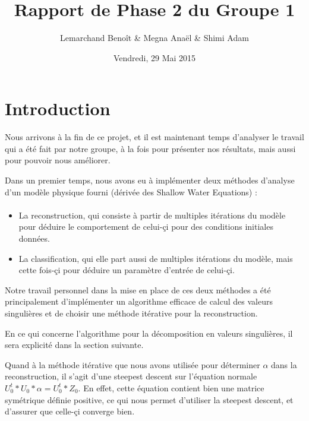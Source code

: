 \documentclass[a4paper,12pt]{article}
\title{\Huge\textbf{Rapport de Phase 2 du Groupe 1}}
\author{Lemarchand Benoît \& Megna Anaël \& Shimi Adam}
\date{Vendredi, 29 Mai 2015}
\begin{document}
\begin{titlepage}
  \maketitle
  \thispagestyle{empty}
  \tableofcontents
\end{titlepage}

\section{Introduction}

    Nous arrivons à la fin de ce projet, et il est maintenant temps
    d'analyser le travail qui a été fait par notre groupe, à la fois
    pour présenter nos résultats, mais aussi pour pouvoir nous améliorer.

    Dans un premier temps, nous avons eu à implémenter deux méthodes 
    d'analyse d'un modèle physique fourni (dérivée des Shallow Water Equations) :

    \paragraph{}
    \begin{itemize}
        \item La reconstruction, qui consiste à partir de multiples itérations
        du modèle pour déduire le comportement de celui-çi pour des conditions
        initiales données.
        \item La classification, qui elle part aussi de multiples itérations
        du modèle, mais cette fois-çi pour déduire un paramètre d'entrée de
        celui-çi.
    \end{itemize}

\bigskip 

    Notre travail personnel dans la mise en place de ces deux méthodes
    a été principalement d'implémenter un algorithme efficace de calcul
    des valeurs singulières et de choisir une méthode itérative pour la
    reconstruction.

    En ce qui concerne l'algorithme pour la décomposition en valeurs
    singulières, il sera explicité dans la section suivante.

    Quand à la méthode itérative que nous avons utilisée pour
    déterminer $\alpha$ dans la reconstruction, il s'agit d'une
    steepest descent sur l'équation normale $U_{0}^t*U_{0}*\alpha = U_{0}^t*Z_0$.
    En effet, cette équation contient bien une matrice symétrique
    définie positive, ce qui nous permet d'utiliser la steepest descent,
    et d'assurer que celle-çi converge bien.
\end{document}

